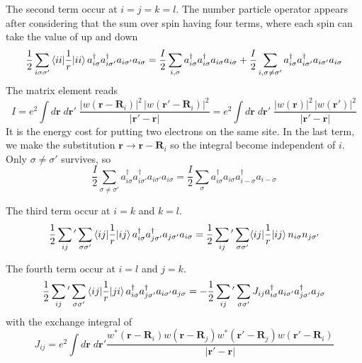 \documentclass[../../../main.tex]{subfiles}
\begin{document}
The second term occur at $i=j=k=l$.
The number particle operator appears after considering that the sum over spin having four terms, where each spin can take the value of up and down
\begin{equation*}
    \frac{1}{2}
    \sum_{i\sigma\sigma'} \braket{ii| \frac{1}{r} | ii } a^\dagger_{i\sigma} a^\dagger_{i\sigma'} a_{i\sigma'} a_{i\sigma} =
    \frac{I}{2}  \sum_{i,\sigma} a^\dagger_{i\sigma} a^\dagger_{i\sigma} a_{i\sigma} a_{i\sigma}
    +\frac{I}{2} \sum_{i,\sigma\neq\sigma'} a^\dagger_{i\sigma} a^\dagger_{i\sigma'} a_{i\sigma'} a_{i\sigma}
\end{equation*}
The matrix element reads
\begin{equation*}
    I =e^{2}\int d \mathbf{r}\;d \mathbf{r}'\;\frac{\big|w(\mathbf{r}-\mathbf{R}_{i})\big|^{2}\,\big|w(\mathbf{r}'-\mathbf{R}_{i})\big|^{2}}{|\mathbf{r}'-\mathbf{r}|}
    =e^{2} \int  d\mathbf r \;d\mathbf r'\; \frac{|w(\mathbf r)|^{2}\,|w(\mathbf r')|^{2}}{|\mathbf r'-\mathbf r|}
\end{equation*}
It is the energy cost for putting two electrons on the same site.
In the last term, we make the substitution $\mathbf{r} \rightarrow \mathbf{r} - \mathbf{R}_i $ so the integral become independent of $i$.
Only $\sigma \neq \sigma'$ survives, so
\begin{equation*}
    \frac{I}{2} \sum_{\sigma\neq\sigma'} a^\dagger_{i\sigma} a^\dagger_{i\sigma'} a_{i\sigma'} a_{i\sigma} = \frac{I}{2} \sum_{\sigma} a^\dagger_{i\sigma}a_{i\sigma} a^\dagger_{i-\sigma} a_{i-\sigma}
\end{equation*}

The third term occur at $i=k$ and $k=l$.
\begin{equation*}
    \frac{1}{2}\sum_{ij}{}' \sum_{\sigma \sigma'}
    \braket{ i   j  | \frac{1}{r} |   ij   }
    a^\dagger_{ i  \sigma} a^\dagger_{  j  \sigma'} a_{j  \sigma'}a_{i \sigma}
    = \frac{1}{2}\sum_{ij}^{ }{} '  \sum_{\sigma\sigma'}\langle ij|\frac{1}{r}|ij\rangle\,n_{i\sigma}n_{j\sigma'}
\end{equation*}

The fourth term occur at $i=l$ and $j=k$.
\begin{equation*}
    \frac{1}{2}\sum_{ij}{}' \sum_{\sigma \sigma'}
    \braket{ i   j  | \frac{1}{r} | ji   }
    a^\dagger_{ i  \sigma} a^\dagger_{  j  \sigma'} a_{i  \sigma'}a_{  j  \sigma}
    = -\frac{1}{2}\sum_{ij}{}' \sum_{\sigma\sigma'}J_{ij}a_{i\sigma}^{\dagger}a_{i\sigma'}a_{j\sigma'}^{\dagger}a_{j\sigma}
\end{equation*}
with the exchange integral of
\begin{equation*}
    J_{ij} = e^{2}\int d \mathbf{r}\;d \mathbf{r}' \frac{w ^*(\mathbf{r}-\mathbf{R}_{i})w(\mathbf{r}-\mathbf{R}_{j})w ^*(\mathbf{r}'-\mathbf{R}_{j})w(\mathbf{r}'-\mathbf{R}_{i})}{|\mathbf{r}'-\mathbf{r}|}
\end{equation*}
\end{document}
